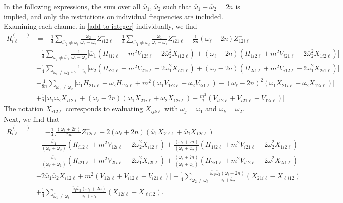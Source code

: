 \documentclass[letterpaper,11pt]{article}
\newcommand{\oi}{\omega_i}
\newcommand{\ol}{\omega_\ell}
\newcommand{\oone}{\overline{\omega}_1}
\newcommand{\otwo}{\overline{\omega}_2}
\begin{document}
In the following expressions, the sum over all $\oone$, $\otwo$ such that $\oone + \otwo = 2n$ is implied, and only the restrictions on individual frequencies are included. Examining each channel in \eqref{add to integer} individually, we find
\begin{align}
\label{R1}
\overline{R}^{(++)}_{i \ell} &= - \frac{1}{4} \sum_{\otwo \neq \ol} \frac{\otwo}{\ol - \otwo} Z^{-}_{i12\ell} - \frac{1}{4} \sum_{\oone \neq \ol} \frac{\oone}{\ol - \oone} Z^{-}_{i21\ell} - \frac{1}{8n} \left( \ol - 2n \right) Z^-_{12i\ell} \nonumber \\
%
& - \frac{1}{4} \sum_{\oi \neq \oone} \frac{1}{\ol - \otwo} \Big[ \oone \left( H_{i12\ell} + m^2 V_{12i\ell} - 2 \otwo^2 X_{i12\ell} \right) + (\ol - 2n) \left( H_{1i2\ell} + m^2 V_{i21\ell} - 2\otwo^2 X_{1i2\ell} \right)\Big] \nonumber \\
%
& - \frac{1}{4} \sum_{\oi \neq \otwo} \frac{1}{\ol - \oone} \Big[ \otwo \left( H_{i21\ell} + m^2 V_{21i\ell} - 2\oone^2 X_{i21\ell} \right) + (\ol - 2n) \left( H_{2i1\ell} + m^2 V_{i12\ell} - 2\oone^2 X_{2i1\ell} \right) \Big] \nonumber \\
%
& - \frac{1}{8n} \sum_{\oone \neq \otwo} \Big[ \oone H_{21i\ell} + \otwo H_{12i\ell} + m^2 \left( \oone V_{1i2\ell} + \otwo V_{2i1\ell} \right) - \left( \ol - 2n \right)^2 \left(\oone X_{21i\ell} + \otwo X_{12i\ell} \right) \Big] \nonumber \\
%
& + \frac{1}{2} \Big[ \oone\otwo X_{i12\ell} + \left( \ol - 2n \right)\left( \oone X_{21i\ell} + \otwo X_{12i\ell} \right) - \frac{m^2}{2} \left( V_{i12\ell} + V_{i21\ell} + V_{12i\ell} \right) \Big]
\end{align}
The notation $X_{i12\ell}$ corresponds to evaluating $X_{ijk\ell}$ with $\omega_j = \oone$ and $\omega_k = \otwo$. Next, we find that
\begin{align}
\label{R2}
\overline{R}_{i \ell}^{(+-)} &= - \frac{1}{4} \Big[ \frac{(\ol + 2n)}{2n} Z^-_{12i\ell} + 2 (\ol + 2n) \left( \oone X_{21i\ell} + \otwo X_{12i\ell} \right) \nonumber \\
%
& -\frac{\oone}{(\ol + \otwo)} \left( H_{i12\ell} + m^2 V_{12i\ell} - 2 \otwo^2 X_{i12\ell} \right) + \frac{(\ol + 2n)}{(\ol + \otwo)} \left( H_{1i2\ell} + m^2 V_{i21\ell} - 2\otwo^2 X_{1i2\ell} \right)  \nonumber \\
%
&- \frac{\otwo}{(\ol + \oone)} \left( H_{i21\ell} + m^2 V_{21i\ell} - 2\oone^2 X_{i21\ell} \right) + \frac{(\ol + 2n)}{(\ol + \oone)} \left(H_{2i1\ell} + m^2 V_{i12\ell} - 2\oone^2 X_{2i1\ell} \right)  \nonumber \\
%
&  - 2 \oone\otwo X_{i12\ell} + m^2 \left( V_{12i\ell} + V_{i12\ell} + V_{i21\ell} \right) \Big] + \frac{1}{4} \sum_{\otwo \neq \ol} \frac{\oone\otwo(\ol + 2n)}{\ol + \otwo} \left( X_{21i\ell} - X_{\ell i 12} \right) \nonumber \\
%
& + \frac{1}{4} \sum_{\oone \neq \ol} \frac{\oone\otwo(\ol + 2n)}{\ol + \oone} \left( X_{12i\ell} - X_{\ell i 12} \right).
\end{align}
\end{document}
